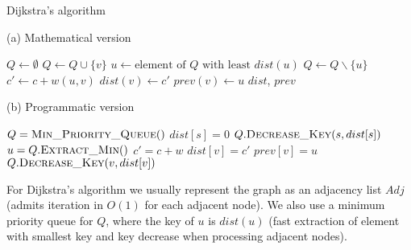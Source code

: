 \begin{center}
    \begin{algorithm}[ht]
        \caption{Dijkstra's algorithm}
        \label{alg-dijkstra}
        \begin{minipage}[t]{0.49\linewidth}
            (a) Mathematical version
            \begin{algorithmic}[1]
                    \State $Q \gets \emptyset$
                        \State $Q \gets Q \cup \{v\}$
                    \EndFor
                        \State $u \gets \text{element of } Q \text{ with least } dist(u)$
                        \State $Q \gets Q \backslash \{u\}$
                            \State $c' \gets c + w(u, v)$
                                \State $dist(v) \gets c'$
                                \State $prev(v) \gets u$
                            \EndIf
                        \EndFor
                    \EndWhile
                    \State \Return $dist$, $prev$
                \EndFunction
            \end{algorithmic}
        \end{minipage}
        \begin{minipage}[t]{0.49\linewidth}
            (b) Programmatic version
            \begin{algorithmic}[1]
                    \State $Q = \Call{Min\_Priority\_Queue}{ }$
                    \EndFor
                    \State $dist[s] = 0$
                    \State $Q.\Call{Decrease\_Key}{s, dist[s]}$
                        \State $u = Q.\Call{Extract\_Min}{ }$
                            \State $c' = c + w$
                                \State $dist[v] = c'$
                                \State $prev[v] = u$
                                \State $Q.\Call{Decrease\_Key}{v, dist[v]}$
                            \EndIf
                        \EndFor
                    \EndWhile
                    \State {}
                \EndFunction
            \end{algorithmic}
        \end{minipage}
    \end{algorithm}
\end{center}
For Dijkstra's algorithm we usually represent the graph as an adjacency list $Adj$ (admits iteration in $O(1)$ for each adjacent node). We also use a minimum priority queue for $Q$, where the key of $u$ is $dist(u)$ (fast extraction of element with smallest key and key decrease when processing adjacent nodes).
